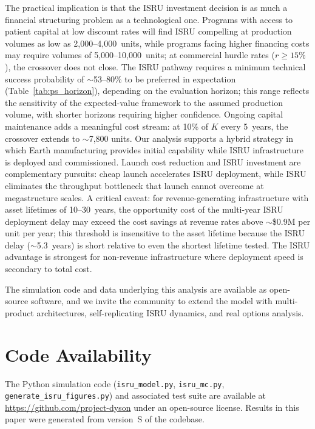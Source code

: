 \documentclass[preprint,12pt]{elsarticle}
\begin{document}
The practical implication is that the ISRU investment decision is as much a financial structuring problem as a technological one. Programs with access to patient capital at low discount rates will find ISRU compelling at production volumes as low as 2{,}000--4{,}000~units, while programs facing higher financing costs may require volumes of 5{,}000--10{,}000~units; at commercial hurdle rates ($r \geq 15\%$), the crossover does not close. The ISRU pathway requires a minimum technical success probability of $\sim$53--80\% to be preferred in expectation (Table~\ref{tab:ps_horizon}), depending on the evaluation horizon; this range reflects the sensitivity of the expected-value framework to the assumed production volume, with shorter horizons requiring higher confidence. Ongoing capital maintenance adds a meaningful cost stream: at 10\% of $K$ every 5~years, the crossover extends to $\sim$7{,}800 units. Our analysis supports a hybrid strategy in which Earth manufacturing provides initial capability while ISRU infrastructure is deployed and commissioned. Launch cost reduction and ISRU investment are complementary pursuits: cheap launch accelerates ISRU deployment, while ISRU eliminates the throughput bottleneck that launch cannot overcome at megastructure scales. A critical caveat: for revenue-generating infrastructure with asset lifetimes of 10--30~years, the opportunity cost of the multi-year ISRU deployment delay may exceed the cost savings at revenue rates above ${\sim}$\$0.9M per unit per year; this threshold is insensitive to the asset lifetime because the ISRU delay ($\sim$5.3~years) is short relative to even the shortest lifetime tested. The ISRU advantage is strongest for non-revenue infrastructure where deployment speed is secondary to total cost.

The simulation code and data underlying this analysis are available as open-source software, and we invite the community to extend the model with multi-product architectures, self-replicating ISRU dynamics, and real options analysis.

\section*{Code Availability}

The Python simulation code (\texttt{isru\_model.py}, \texttt{isru\_mc.py}, \texttt{generate\_isru\_figures.py}) and associated test suite are available at \url{https://github.com/project-dyson} under an open-source license. Results in this paper were generated from version~S of the codebase.
\end{document}
